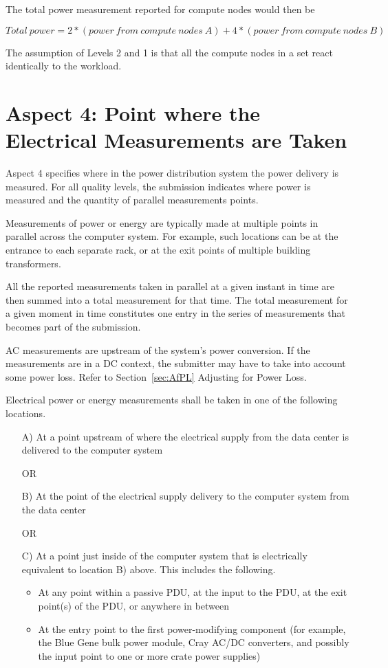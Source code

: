\noindent
The total power measurement reported for compute nodes would then be 

\noindent
\[ Total~power=2*(power~from~compute~nodes~A) 
                              + 4*(power~from~compute~nodes~B) \]

\noindent
The assumption of Levels 2 and 1 is that all the compute nodes in a set react identically to the workload.


\section{Aspect 4: Point where the Electrical Measurements are Taken}
\label{sec:A4wEMaT}
Aspect 4 specifies where in the power distribution system the power delivery is measured.  For all quality levels, the submission indicates where power is measured and the quantity of parallel measurements points.
\wl

\noindent
Measurements of power or energy are typically made at multiple points in parallel across the computer system. For example, such locations can be at the entrance to each separate rack, or at the exit points of multiple building transformers. 
\wl

\noindent
All the reported measurements taken in parallel at a given instant in time are then summed into a total measurement for that time.  The total measurement for a given moment in time constitutes one entry in the series of measurements that becomes part of the submission.
\wl

\noindent
AC measurements are upstream of the system's power conversion. If the measurements are in a DC context, the submitter may have to take into account some power loss. 
Refer to Section~\ref{sec:AfPL} Adjusting for Power Loss.
\wl

\noindent
Electrical power or energy measurements shall be taken in one of the following locations.

\begin{itemize}
\item[{A)}]
At a point upstream of where the electrical supply from the data center is delivered to the computer system

OR

\item[{B)}]
At the point of the electrical supply delivery to the computer system from the data center

OR

\item[{C)}]
At a point just inside of the computer system that is electrically equivalent to location B) above.  This includes the following. 

\begin{itemize}
\item
At any point within a passive PDU, at the input to the PDU, at the exit point(s) of the PDU, or anywhere in between 
\item
At the entry point to the first power-modifying component (for example, the Blue Gene bulk power module, Cray AC/DC converters, and possibly the input point to one or more crate power supplies)
\end{itemize}
\end{itemize}

